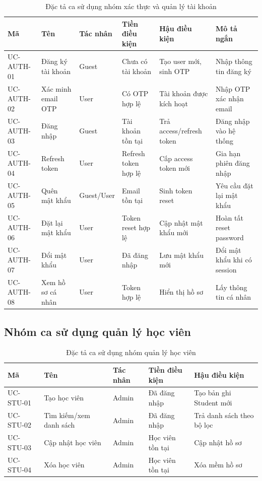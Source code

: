 \documentclass[../DoAn.tex]{subfiles}
\begin{document}
\begin{table}[H]
\centering
\caption{Đặc tả ca sử dụng nhóm xác thực và quản lý tài khoản}
\label{table:bang2.3}
\scriptsize
\begin{tabular}{|l|l|l|p{2.5cm}|p{2.5cm}|p{3cm}|}
\hline
\textbf{Mã} & \textbf{Tên} & \textbf{Tác nhân} & \textbf{Tiền điều kiện} & \textbf{Hậu điều kiện} & \textbf{Mô tả ngắn} \\ \hline
UC-AUTH-01 & Đăng ký tài khoản & Guest & Chưa có tài khoản & Tạo user mới, sinh OTP & Nhập thông tin đăng ký \\ \hline
UC-AUTH-02 & Xác minh email OTP & User & Có OTP hợp lệ & Tài khoản được kích hoạt & Nhập OTP xác nhận email \\ \hline
UC-AUTH-03 & Đăng nhập & Guest & Tài khoản tồn tại & Trả access/refresh token & Đăng nhập vào hệ thống \\ \hline
UC-AUTH-04 & Refresh token & User & Refresh token hợp lệ & Cấp access token mới & Gia hạn phiên đăng nhập \\ \hline
UC-AUTH-05 & Quên mật khẩu & Guest/User & Email tồn tại & Sinh token reset & Yêu cầu đặt lại mật khẩu \\ \hline
UC-AUTH-06 & Đặt lại mật khẩu & User & Token reset hợp lệ & Cập nhật mật khẩu mới & Hoàn tất reset password \\ \hline
UC-AUTH-07 & Đổi mật khẩu & User & Đã đăng nhập & Lưu mật khẩu mới & Đổi mật khẩu khi có session \\ \hline
UC-AUTH-08 & Xem hồ sơ cá nhân & User & Token hợp lệ & Hiển thị hồ sơ & Lấy thông tin cá nhân \\ \hline
\end{tabular}
\end{table}

\subsection{Nhóm ca sử dụng quản lý học viên}

\begin{table}[H]
\centering
\caption{Đặc tả ca sử dụng nhóm quản lý học viên}
\label{table:bang2.4}
\begin{tabular}{|l|p{3.5cm}|l|p{2.5cm}|p{3cm}|}
\hline
\textbf{Mã} & \textbf{Tên} & \textbf{Tác nhân} & \textbf{Tiền điều kiện} & \textbf{Hậu điều kiện} \\ \hline
UC-STU-01 & Tạo học viên & Admin & Đã đăng nhập & Tạo bản ghi Student mới \\ \hline
UC-STU-02 & Tìm kiếm/xem danh sách & Admin & Đã đăng nhập & Trả danh sách theo bộ lọc \\ \hline
UC-STU-03 & Cập nhật học viên & Admin & Học viên tồn tại & Cập nhật hồ sơ \\ \hline
UC-STU-04 & Xóa học viên & Admin & Học viên tồn tại & Xóa mềm hồ sơ \\ \hline
\end{tabular}
\end{table}
\end{document}
